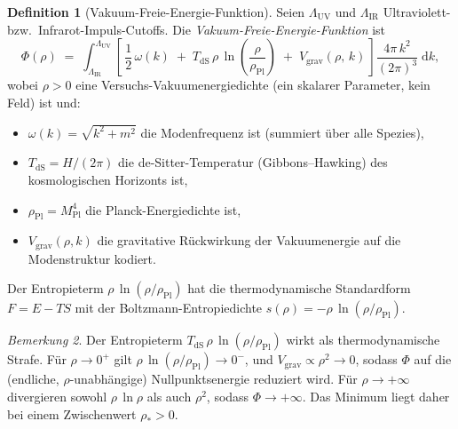 \documentclass[12pt,a4paper]{article}
\theoremstyle{definition}
\newtheorem{definition}{Definition}[section]
\theoremstyle{plain}
\theoremstyle{remark}
\newtheorem{remark}[definition]{Bemerkung}
\newcommand{\LUV}{\Lambda_{\mathrm{UV}}}
\newcommand{\LIR}{\Lambda_{\mathrm{IR}}}
\newcommand{\dd}{\mathrm{d}}
\begin{document}
\begin{definition}[Vakuum-Freie-Energie-Funktion]\label{def:functional}
Seien $\LUV$ und $\LIR$ Ultraviolett- bzw.\ Infrarot-Impuls-Cutoffs.
Die \emph{Vakuum-Freie-Energie-Funktion} ist
\begin{equation}\label{eq:Phi}
  \Phi(\rho) \;=\; \int_{\LIR}^{\LUV}
    \left[\,
      \frac{1}{2}\,\omega(k)\;+\;
      T_{\mathrm{dS}}\,\rho\,\ln\!\left(\frac{\rho}{\rho_{\mathrm{Pl}}}\right)
      \;+\; V_{\mathrm{grav}}(\rho,\,k)
    \,\right]
    \frac{4\pi\,k^{2}}{(2\pi)^{3}}\;\dd k,
\end{equation}
wobei $\rho > 0$ eine Versuchs-Vakuumenergiedichte (ein skalarer Parameter, kein Feld) ist und:
\begin{itemize}
  \item $\omega(k) = \sqrt{k^{2} + m^{2}}$ die Modenfrequenz ist (summiert
        \"uber alle Spezies),
  \item $T_{\mathrm{dS}} = H/(2\pi)$ die de-Sitter-Temperatur (Gibbons--Hawking)
        des kosmologischen Horizonts ist,
  \item $\rho_{\mathrm{Pl}} = M_{\mathrm{Pl}}^{4}$ die
        Planck-Energiedichte ist,
  \item $V_{\mathrm{grav}}(\rho,k)$ die gravitative R\"uckwirkung der
        Vakuumenergie auf die Modenstruktur kodiert.
\end{itemize}
Der Entropieterm $\rho\,\ln(\rho/\rho_{\mathrm{Pl}})$ hat die thermodynamische Standardform $F = E - TS$ mit der Boltzmann-Entropiedichte $s(\rho) = -\rho\,\ln(\rho/\rho_{\mathrm{Pl}})$.
\end{definition}

\begin{remark}
Der Entropieterm $T_{\mathrm{dS}}\,\rho\,\ln(\rho/\rho_{\mathrm{Pl}})$
wirkt als thermodynamische Strafe.  F\"ur $\rho \to 0^{+}$ gilt
$\rho\,\ln(\rho/\rho_{\mathrm{Pl}}) \to 0^{-}$, und $V_{\mathrm{grav}}
\propto \rho^{2} \to 0$, sodass $\Phi$ auf die (endliche,
$\rho$-unabh\"angige) Nullpunktsenergie reduziert wird.  F\"ur
$\rho \to +\infty$ divergieren sowohl $\rho\,\ln\rho$ als auch
$\rho^{2}$, sodass $\Phi \to +\infty$.  Das Minimum liegt daher bei
einem Zwischenwert $\rho_{\ast} > 0$.
\end{remark}
\end{document}
